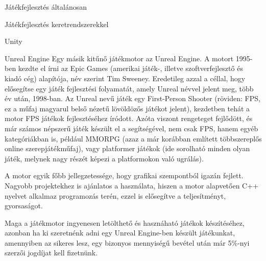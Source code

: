 \begin{MyChapter}{Játékfejlesztés általánosan}
\begin{MySection}{Játékfejlesztés keretrendszerekkel}
\begin{MySubSection}{Unity}
		\end{MySubSection}
		
		\begin{MySubSection}{Unreal Engine}
		Egy másik kitűnő játékmotor az Unreal Engine. A motort 1995-ben kezdte el írni az Epic Games (amerikai játék-, illetve szoftverfejlesztő és kiadó cég) alapítója, név szerint Tim Sweeney. Eredetileg azzal a céllal, hogy elősegítse egy játék fejlesztési folyamatát, amely Unreal névvel jelent meg, több év után, 1998-ban. Az Unreal nevű játék egy First-Person Shooter (röviden: FPS, ez a műfaj magyarul belső nézetű lövöldözős játékot jelent), kezdetben tehát a motor FPS játékok fejlesztéséhez íródott. Azóta viszont rengeteget fejlődött, és már számos népszerű játék készült el a segítségével, nem csak FPS, hanem egyéb kategóriákban is, például MMORPG (azaz a már korábban említett többszereplős online szerepjátékműfaj), vagy platformer játékok (ide sorolható minden olyan játék, melynek nagy részét képezi a platformokon való ugrálás).
		
		A motor egyik főbb jellegzetessége, hogy grafikai szempontból igazán fejlett. Nagyobb projektekhez is ajánlatos a használata, hiszen a motor alapvetően C++ nyelvet alkalmaz programozás terén, ezzel is elősegítve a teljesítményt, gyorsaságot.
		
		Maga a játékmotor ingyenesen letölthető és hasznáható játékok készítéséhez, azonban ha ki szeretnénk adni egy Unreal Engine-ben készült játékunkat, amennyiben az sikeres lesz, egy bizonyos mennyiségű bevétel után már 5\%-nyi szerzői jogdíjat kell fizetnünk.
		

\end{MySubSection}
\end{MySection}
\end{MyChapter}
